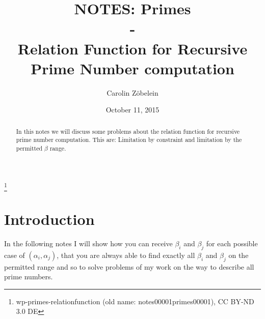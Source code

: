 \documentclass{amsart}
\begin{document}
\title[NOTES: Primes Relation Function]{NOTES: Primes\\
- \\
Relation Function for Recursive Prime Number computation}

\author{Carolin Z\"obelein}
\thanks{wp-primes-relationfunction (old name: notes00001primes00001), CC BY-ND 3.0 DE}

\date{October 11, 2015}

\begin{abstract}
	In this notes we will discuss some problems about the relation function for recursive prime number computation. This are: Limitation by constraint and limitation by the permitted $\beta$ range.
\end{abstract}

\maketitle
\section{Introduction}
\label{s:introduction}
In the following notes I will show how you can receive $\beta_{i}$ and $\beta_{j}$ for each possible case of $\left(\alpha_{i}, \alpha_{j}\right)$, that you are always able to find exactly all $\beta_{i}$ and $\beta_{j}$ on the permitted range and so to solve problems of my work \cite{CaZoeb} on the way to describe all prime numbers.
\end{document}
